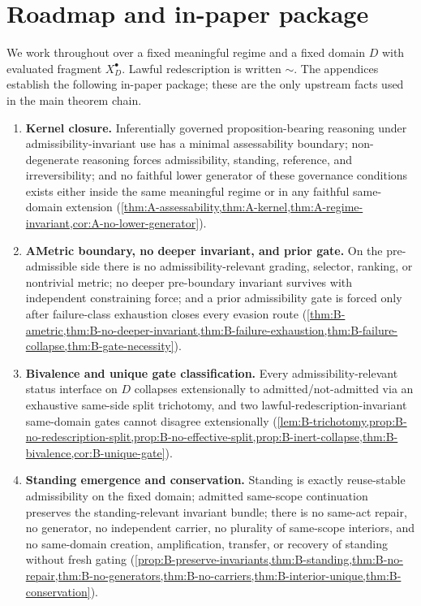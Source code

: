 \documentclass[11pt]{article}
\theoremstyle{plain}
\theoremstyle{definition}
\newcommand{\Law}{\sim}
\newcommand{\Eval}{X_D^{\bullet}}
\newcommand{\domain}{D}
\begin{document}
\section{Roadmap and in-paper package}
\label{sec:roadmap}

We work throughout over a fixed meaningful regime and a fixed domain $\domain$ with evaluated fragment $\Eval$. Lawful redescription is written $\Law$. The appendices establish the following in-paper package; these are the only upstream facts used in the main theorem chain.

\begin{enumerate}[label=\textbf{(P\arabic*)}, leftmargin=3.1em]
    \item \textbf{Kernel closure.} Inferentially governed proposition-bearing reasoning under admissibility-invariant use has a minimal assessability boundary; non-degenerate reasoning forces admissibility, standing, reference, and irreversibility; and no faithful lower generator of these governance conditions exists either inside the same meaningful regime or in any faithful same-domain extension (\cref{thm:A-assessability,thm:A-kernel,thm:A-regime-invariant,cor:A-no-lower-generator}).

    \item \textbf{AMetric boundary, no deeper invariant, and prior gate.} On the pre-admissible side there is no admissibility-relevant grading, selector, ranking, or nontrivial metric; no deeper pre-boundary invariant survives with independent constraining force; and a prior admissibility gate is forced only after failure-class exhaustion closes every evasion route (\cref{thm:B-ametric,thm:B-no-deeper-invariant,thm:B-failure-exhaustion,thm:B-failure-collapse,thm:B-gate-necessity}).

    \item \textbf{Bivalence and unique gate classification.} Every admissibility-relevant status interface on $\domain$ collapses extensionally to admitted/not-admitted via an exhaustive same-side split trichotomy, and two lawful-redescription-invariant same-domain gates cannot disagree extensionally (\cref{lem:B-trichotomy,prop:B-no-redescription-split,prop:B-no-effective-split,prop:B-inert-collapse,thm:B-bivalence,cor:B-unique-gate}).

    \item \textbf{Standing emergence and conservation.} Standing is exactly reuse-stable admissibility on the fixed domain; admitted same-scope continuation preserves the standing-relevant invariant bundle; there is no same-act repair, no generator, no independent carrier, no plurality of same-scope interiors, and no same-domain creation, amplification, transfer, or recovery of standing without fresh gating (\cref{prop:B-preserve-invariants,thm:B-standing,thm:B-no-repair,thm:B-no-generators,thm:B-no-carriers,thm:B-interior-unique,thm:B-conservation}).


\end{enumerate}
\end{document}
